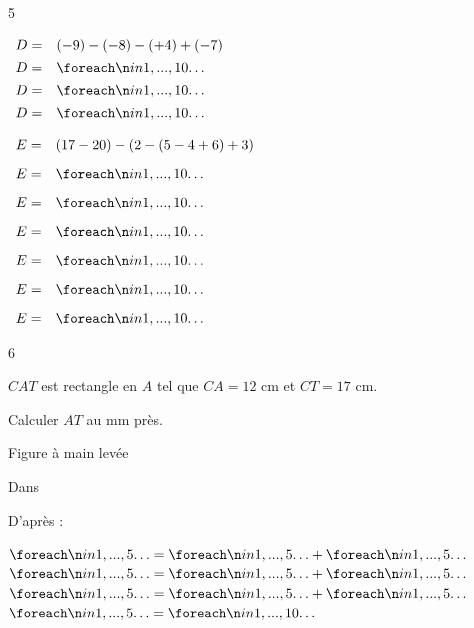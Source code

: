 \documentclass[a4paper]{book}
\begin{document}
{\begin{exerciceNote}{5}
\begin{minipage}{0.30\linewidth}
            $\begin{array}{ll}
                D = & (-9)-(-8)-(+4)+(-7) \\[1ex]
                D = & \points[10]\\[1ex]
                D = & \points[10]\\[1ex]
                D = & \points[10]
            \end{array}$
        \end{minipage}
        \hfill
        \begin{minipage}[t]{0.30\linewidth}
            $\begin{array}{ll}
                E = & (17-20)-(2-(5-4+6)+3) \\[2ex]
                E = & \points[10] \\[2ex]
                E = & \points[10] \\[2ex]
                E = & \points[10] \\[2ex]
                E = & \points[10] \\[2ex]
                E = & \points[10] \\[2ex]
                E = & \points[10]
            \end{array}$
        \end{minipage}
    \end{exerciceNote}


    \begin{exerciceNote}{6}
        \begin{minipage}{0.5\linewidth}
             $CAT$ est rectangle en $A$ tel que $CA = 12$ cm et $CT = 17$ cm. 
    
            Calculer $AT$ au mm près.
    
            \begin{center}
                \small{Figure à main levée}
                
            \end{center}
                
            Dans \points[18]
    
            \medskip
    
            D'après \points[15] :
    
            \medskip
    
            $\points[5] = \points[5]+\points[5]$ \\
            $\points[5] = \points[5]+\points[5]$ \\
            $\points[5] = \points[5]+\points[5]$ \\
            $\points[5] = \points[10]$ 
    

\end{minipage}
\end{exerciceNote}}
\end{document}
